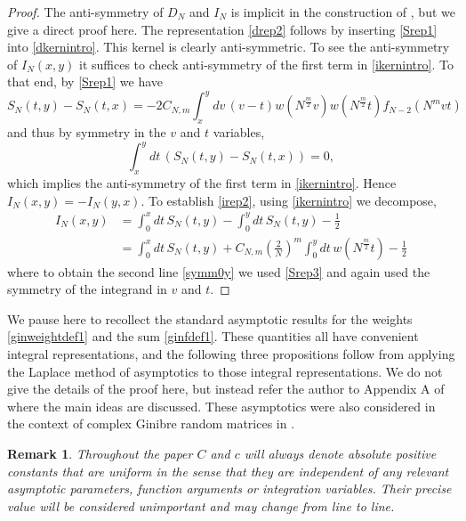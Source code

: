 \documentclass[11pt,reqno]{amsproc}
\newtheorem{remark}[theorem]{Remark}
\numberwithin{equation}{section}
\numberwithin{theorem}{section}
\begin{document}
\begin{proof}
The anti-symmetry of $D_{N}$ and $I_{N}$ is implicit in the construction of \cite{FI16}, but we give a direct proof here. The representation \eqref{drep2} follows by inserting \eqref{Srep1} into \eqref{dkernintro}. This kernel is clearly anti-symmetric. To see the anti-symmetry of $I_{N}(x,y)$ it suffices to check anti-symmetry of the first term in \eqref{ikernintro}. To that end, by \eqref{Srep1} we have
\begin{equation}
S_{N}(t,y)-S_{N}(t,x) = -2C_{N,m}\int_{x}^{y}dv\,(v-t)w(N^{\frac{m}{2}}v)w(N^{\frac{m}{2}}t)f_{N-2}(N^{m}vt)
\end{equation}
and thus by symmetry in the $v$ and $t$ variables,
\begin{equation}
\int_{x}^{y}dt\,(S_{N}(t,y)-S_{N}(t,x)) = 0,
\end{equation}
which implies the anti-symmetry of the first term in \eqref{ikernintro}. Hence $I_{N}(x,y) = -I_{N}(y,x)$. To establish \eqref{irep2}, using \eqref{ikernintro} we decompose,
\begin{equation}
\begin{split}
I_{N}(x,y) &= \int_{0}^{x}dt\,S_{N}(t,y)-\int_{0}^{y}dt\,S_{N}(t,y)-\frac{1}{2}\\
&= \int_{0}^{x}dt\,S_{N}(t,y)+C_{N,m}\left(\frac{2}{N}\right)^{m}\int_{0}^{y}dt\,w(N^{\frac{m}{2}}t)-\frac{1}{2} \label{symm0y}
\end{split}
\end{equation}
where to obtain the second line \eqref{symm0y} we used \eqref{Srep3} and again used the symmetry of the integrand in $v$ and $t$.
\end{proof}
We pause here to recollect the standard asymptotic results for the weights \eqref{ginweightdef1} and the sum \eqref{ginfdef1}. These quantities all have convenient integral representations, and the following three propositions follow from applying the Laplace method of asymptotics to those integral representations. We do not give the details of the proof here, but instead refer the author to Appendix A of \cite{LMS21} where the main ideas are discussed. These asymptotics were also considered in the context of complex Ginibre random matrices in \cite{AB12}.
\begin{remark}
Throughout the paper $C$ and $c$ will always denote absolute positive constants that are uniform in the sense that they are independent of any relevant asymptotic parameters, function arguments or integration variables. Their precise value will be considered unimportant and may change from line to line.
\end{remark}
\end{document}
